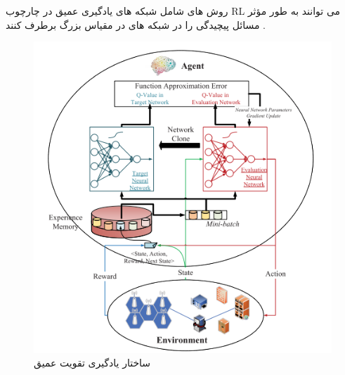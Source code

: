   روش های  شامل شبکه های یادگیری عمیق در چارچوب RL می توانند به طور مؤثر مسائل پیچیدگی را در شبکه های در مقیاس بزرگ برطرف کنند
  \cite{aiNS}.
  \begin{figure}%
  \centering  
    \includegraphics[scale = 0.7]{./fig/dlNS}
  \caption{ساختار یادگیری تقویت عمیق\cite{drl}}
  \label{fig:drl}
\end{figure}
